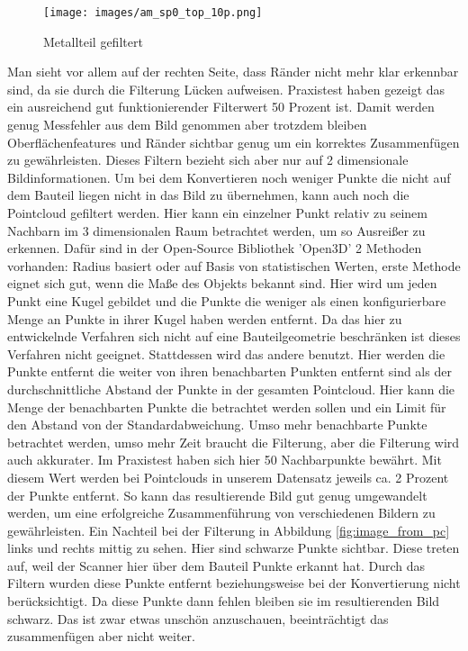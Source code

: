 \documentclass[../main.tex]{subfiles}
\begin{document}
\begin{figure}[h]
    \centering
    \texttt{[image: images/am\_sp0\_top\_10p.png]}
    \caption{Metallteil gefiltert}\label{fig:metall_image}
\end{figure}

Man sieht vor allem auf der rechten Seite, dass Ränder nicht mehr klar erkennbar sind, 
da sie durch die Filterung Lücken aufweisen. Praxistest haben gezeigt das ein 
ausreichend gut funktionierender Filterwert 50 Prozent ist. Damit werden genug 
Messfehler aus dem Bild genommen aber trotzdem bleiben Oberflächenfeatures und Ränder
sichtbar genug um ein korrektes Zusammenfügen zu gewährleisten.
Dieses Filtern bezieht sich aber nur auf 2 dimensionale Bildinformationen.
Um bei dem Konvertieren noch weniger Punkte die nicht auf dem Bauteil liegen nicht in das Bild zu übernehmen, kann auch noch die Pointcloud gefiltert werden.
Hier kann ein einzelner Punkt relativ zu seinem Nachbarn im 3 dimensionalen Raum betrachtet werden, 
um so Ausreißer zu erkennen. Dafür sind in der Open-Source
Bibliothek 'Open3D' 2 Methoden vorhanden: Radius basiert oder auf Basis von 
statistischen Werten, erste Methode eignet sich gut, wenn die Maße des Objekts bekannt
sind. Hier wird um jeden Punkt eine Kugel gebildet und die Punkte die weniger als 
einen konfigurierbare Menge an Punkte in ihrer Kugel haben werden entfernt. Da 
das hier zu entwickelnde Verfahren sich nicht auf eine Bauteilgeometrie beschränken
ist dieses Verfahren nicht geeignet. Stattdessen wird das andere benutzt. Hier werden
die Punkte entfernt die weiter von ihren benachbarten Punkten entfernt sind als der 
durchschnittliche Abstand der Punkte in der gesamten Pointcloud. Hier kann die Menge der 
benachbarten Punkte die betrachtet werden sollen und ein Limit für den Abstand von der 
Standardabweichung. Umso mehr benachbarte Punkte betrachtet werden, umso mehr Zeit 
braucht die Filterung, aber die Filterung wird auch akkurater. Im Praxistest haben sich
hier 50 Nachbarpunkte bewährt. Mit diesem Wert werden bei Pointclouds in unserem 
Datensatz jeweils ca. 2 Prozent der Punkte entfernt. So kann das resultierende
Bild gut genug umgewandelt werden, um eine erfolgreiche Zusammenführung 
von verschiedenen Bildern zu gewährleisten.
Ein Nachteil bei der Filterung in Abbildung \ref{fig:image_from_pc} links und rechts 
mittig zu sehen. Hier sind schwarze Punkte sichtbar. Diese treten auf, weil der Scanner
hier über dem Bauteil Punkte erkannt hat. Durch das Filtern wurden diese Punkte entfernt
beziehungsweise bei der Konvertierung nicht berücksichtigt. Da diese Punkte dann fehlen
bleiben sie im resultierenden Bild schwarz. Das ist zwar etwas unschön anzuschauen, 
beeinträchtigt das zusammenfügen aber nicht weiter. 
\end{document}
